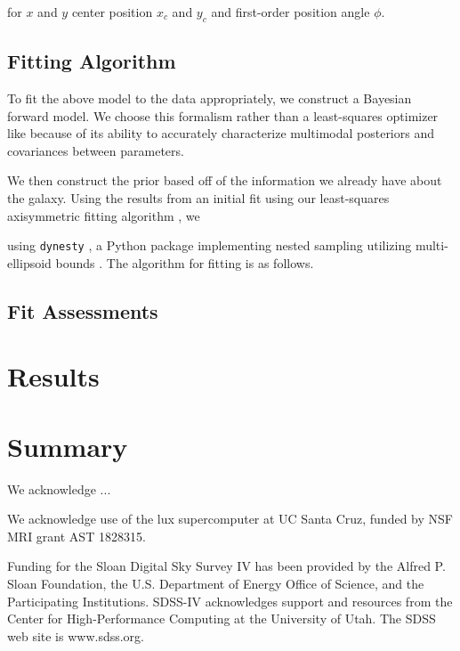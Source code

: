 \noindent for $x$ and $y$ center position $x_c$ and $y_c$ and first-order position angle $\phi$. 


\subsection{Fitting Algorithm}

To fit the above model to the data appropriately, we construct a Bayesian forward model. We choose this formalism rather than a least-squares optimizer like \citep{spekkens07} because of its ability to accurately characterize multimodal posteriors and covariances between parameters.


We then construct the prior based off of the information we already have about the galaxy. Using the results from an initial fit using our least-squares axisymmetric fitting algorithm , we

using \texttt{dynesty} \citep{dynesty}, a Python package implementing nested sampling \citep{skilling04, skilling06} utilizing multi-ellipsoid bounds \citep{feroz09}. The algorithm for fitting is as follows.



\subsection{Fit Assessments}

\section{Results}

\section{Summary}



\acknowledgements

We acknowledge ...

We acknowledge use of the lux supercomputer at UC Santa Cruz, funded by NSF MRI grant AST 1828315.

Funding for the Sloan Digital Sky Survey IV has been provided by the
Alfred P. Sloan Foundation, the U.S. Department of Energy Office of
Science, and the Participating Institutions. SDSS-IV acknowledges
support and resources from the Center for High-Performance Computing at
the University of Utah. The SDSS web site is www.sdss.org.

